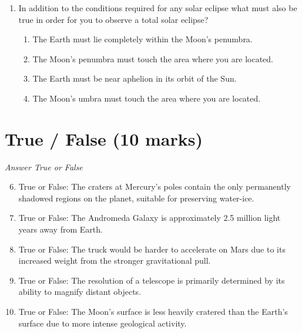 \documentclass[12pt]{article}
\begin{document}
\begin{enumerate}[label=\arabic*.]
\begin{enumerate}[label=(\alph*)]
    \item Perseus
    \item Cygnus
    \item Scorpius
    \item Leo
\end{enumerate}
\item In addition to the conditions required for any solar eclipse what must also be true in order for you to observe a total solar eclipse?
\begin{enumerate}[label=(\alph*)]
    \item The Earth must lie completely within the Moon's penumbra.
    \item The Moon's penumbra must touch the area where you are located.
    \item The Earth must be near aphelion in its orbit of the Sun.
    \item The Moon's umbra must touch the area where you are located.
\end{enumerate}
\end{enumerate}

\section*{True / False (10 marks)}
\textit{Answer True or False}
\begin{enumerate}[label=\arabic*.]
\setcounter{enumi}{5}
\item True or False: The craters at Mercury's poles contain the only permanently shadowed regions on the planet, suitable for preserving water-ice.
\item True or False: The Andromeda Galaxy is approximately 2.5 million light years away from Earth.
\item True or False: The truck would be harder to accelerate on Mars due to its increased weight from the stronger gravitational pull.
\item True or False: The resolution of a telescope is primarily determined by its ability to magnify distant objects.
\item True or False: The Moon's surface is less heavily cratered than the Earth's surface due to more intense geological activity.
\end{enumerate}
\end{document}
